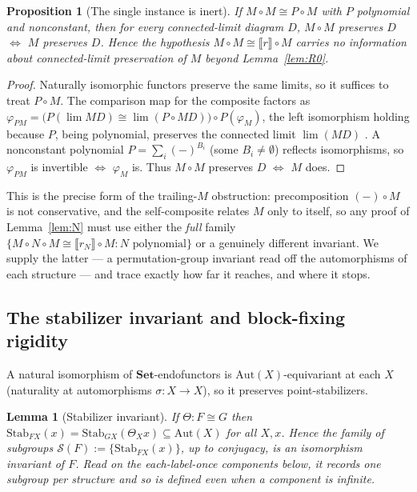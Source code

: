\documentclass[11pt]{amsart}
\theoremstyle{plain}
\newtheorem{proposition}[theorem]{Proposition}
\newtheorem{lemma}[theorem]{Lemma}
\theoremstyle{definition}
\newcommand{\Set}{\mathbf{Set}}
\newcommand{\ext}[1]{\llbracket #1 \rrbracket}
\begin{document}
\begin{proposition}[The single instance is inert]\label{prop:inert}
If $M\circ M\cong P\circ M$ with $P$ polynomial and nonconstant, then for every connected-limit
diagram $D$, $M\circ M$ preserves $D$ $\iff$ $M$ preserves $D$. Hence the hypothesis $M\circ M\cong
\ext{r}\circ M$ carries no information about connected-limit preservation of $M$ beyond
Lemma~\ref{lem:R0}.
\end{proposition}

\begin{proof}
Naturally isomorphic functors preserve the same limits, so it suffices to treat $P\circ M$. The
comparison map for the composite factors as $\varphi_{PM}=\bigl(P(\lim MD)\cong\lim(P\circ MD)\bigr)
\circ P(\varphi_M)$, the left isomorphism holding because $P$, being polynomial, preserves the
connected limit $\lim(MD)$ \cite[\S1]{GambinoKock}. A nonconstant polynomial $P=\sum_i(-)^{B_i}$ (some $B_i\ne\emptyset$)
reflects isomorphisms, so $\varphi_{PM}$ is invertible $\iff$ $\varphi_M$ is. Thus $M\circ M$ preserves
$D$ $\iff$ $M$ does.
\end{proof}

This is the precise form of the trailing-$M$ obstruction: precomposition $(-)\circ M$ is not
conservative, and the self-composite relates $M$ only to itself, so any proof of Lemma~\ref{lem:N}
must use either the \emph{full} family $\{M\circ N\circ M\cong\ext{r_N}\circ M:N\text{ polynomial}\}$
or a genuinely different invariant. We supply the latter --- a permutation-group invariant read off
the automorphisms of each structure --- and trace exactly how far it reaches, and where it stops.

\subsection{The stabilizer invariant and block-fixing rigidity}\label{sec:stab}
A natural isomorphism of $\Set$-endofunctors is $\mathrm{Aut}(X)$-equivariant at each $X$
(naturality at automorphisms $\sigma\colon X\to X$), so it preserves point-stabilizers.

\begin{lemma}[Stabilizer invariant]\label{lem:stab}
If $\Theta\colon F\cong G$ then $\mathrm{Stab}_{FX}(x)=\mathrm{Stab}_{GX}(\Theta_X x)\subseteq
\mathrm{Aut}(X)$ for all $X,x$. Hence the family of subgroups $\mathcal S(F):=\{\mathrm{Stab}_{FX}(x)\}$,
up to conjugacy, is an isomorphism invariant of $F$. Read on the \emph{each-label-once} components
below, it records one subgroup per structure and so is defined even when a component is infinite.
\end{lemma}
\end{document}
